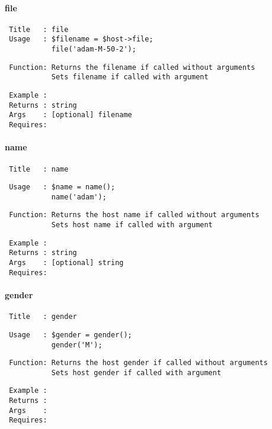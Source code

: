 \paragraph*{file\label{file}}
\begin{verbatim}
 Title   : file
 Usage   : $filename = $host->file;
           file('adam-M-50-2');
\end{verbatim}
\begin{verbatim}
 Function: Returns the filename if called without arguments
           Sets filename if called with argument
\end{verbatim}
\begin{verbatim}
 Example :
 Returns : string
 Args    : [optional] filename
 Requires:
\end{verbatim}
\paragraph*{name\label{name}}
\begin{verbatim}
 Title   : name
\end{verbatim}
\begin{verbatim}
 Usage   : $name = name();
           name('adam');
\end{verbatim}
\begin{verbatim}
 Function: Returns the host name if called without arguments
           Sets host name if called with argument
\end{verbatim}
\begin{verbatim}
 Example :
 Returns : string
 Args    : [optional] string
 Requires:
\end{verbatim}
\paragraph*{gender\label{gender}}
\begin{verbatim}
 Title   : gender
\end{verbatim}
\begin{verbatim}
 Usage   : $gender = gender();
           gender('M');
\end{verbatim}
\begin{verbatim}
 Function: Returns the host gender if called without arguments
           Sets host gender if called with argument
\end{verbatim}
\begin{verbatim}
 Example :
 Returns :
 Args    :
 Requires:
\end{verbatim}


